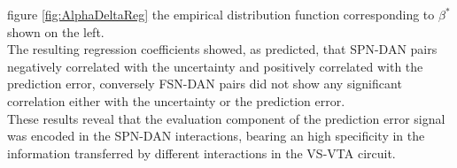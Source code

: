 figure \ref{fig:AlphaDeltaReg} the empirical distribution function corresponding to $\beta^*$ shown on the left.\\The resulting regression coefficients showed, as predicted, that SPN-DAN pairs negatively correlated with the uncertainty and positively correlated with the prediction error, conversely FSN-DAN pairs did not show any significant correlation either with the uncertainty or the prediction error.\\These results reveal that the evaluation component of the prediction error signal was encoded in the SPN-DAN interactions, bearing an high specificity in the information transferred by different interactions in the VS-VTA circuit. 

